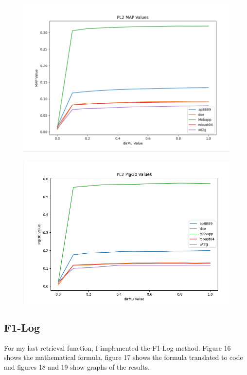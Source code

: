 \documentclass{article}
\begin{document}
\begin{figure}[h!]
\centering
\includegraphics[scale=0.30]{PL2_MAP_VALUES.png}
\caption{}
\end{figure}

\begin{figure}[h!]
\centering
\includegraphics[scale=0.30]{PL2_P30_VALUES.png}
\caption{}
\end{figure}
\clearpage

\subsection*{F1-Log}
For my last retrieval function, I implemented the F1-Log method.  Figure 16 shows the mathematical formula, figure 17 shows the formula translated to code and figures 18 and 19 show graphs of the results.\\
\end{document}

